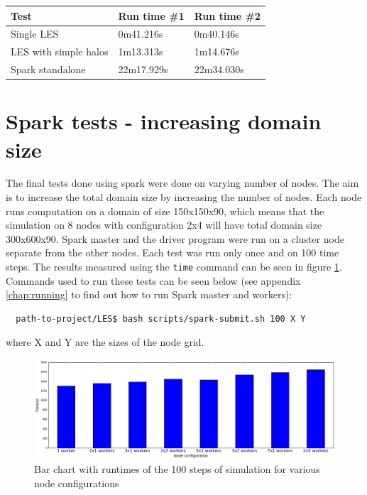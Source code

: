 \documentclass{l4proj}
\begin{document}
\begin{center}
  \begin{tabular}{ | l | l | l | }
      \hline
      Test & Run time \#1 & Run time \#2 \\
      \hline
      Single LES & 0m41.216s & 0m40.146s \\
      LES with simple halos & 1m13.313s & 1m14.676s \\
      Spark standalone & 22m17.929s & 22m34.030s \\
      \hline
  \end{tabular}
  \label{tab:baseline_times}
\end{center}

\section{Spark tests - increasing domain size}

The final tests done using spark were done on varying number of nodes.
The aim is to increase the total domain size by increasing the number of nodes.
Each node runs computation on a domain of size 150x150x90, which means that the simulation
on 8 nodes with configuration 2x4 will have total domain size 300x600x90. Spark master
and the driver program were run on a cluster node separate from the other nodes.
Each test was run only once and on 100 time steps. The results measured using the \texttt{time} command
can be seen in figure \ref{fig:eval}. Commands used to run these tests can be seen below
(see appendix \ref{chap:running} to find out how to run Spark master and workers):
\begin{verbatim}
  path-to-project/LES$ bash scripts/spark-submit.sh 100 X Y
\end{verbatim}
where X and Y are the sizes of the node grid.

\begin{figure}
\centering
\includegraphics[width=1\textwidth]{images/evaluation.png}
\caption{Bar chart with runtimes of the 100 steps of simulation for various node configurations}
\label{fig:eval}
\end{figure}
\end{document}
